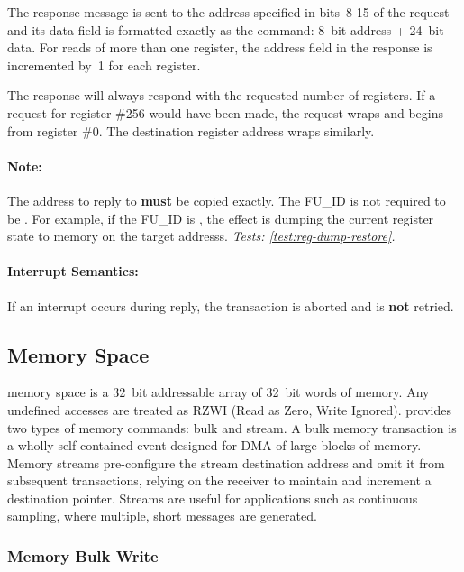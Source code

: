 The response message is sent to the \bus address specified in bits~8-15 of the
request and its data field is formatted exactly as the
 command: 8~bit address + 24~bit data. For reads
of more than one register, the address field in the response is incremented
by~1 for each register.

The response will always respond with the requested number of registers. If a
request for register \#256 would have been made, the request wraps and begins
from register \#0. The destination register address wraps similarly.

\paragraph{Note:} The \bus address to reply to {\bf must} be copied
exactly. The FU\_ID is not required to be . For
example, if the FU\_ID is , the effect is
dumping the current register state to memory on the target addresss.
{\em Tests: \ref{test:reg-dump-restore}.}

\paragraph{Interrupt Semantics:} If an interrupt occurs during reply, the
transaction is aborted and is {\bf not} retried.

\subsection{Memory Space}
\label{cmd:mem}
\proto memory space is a 32~bit addressable array of 32~bit words of memory.
Any undefined accesses are treated as RZWI (Read as Zero, Write Ignored).
\proto provides two types of memory commands: bulk and stream. A bulk memory
transaction is a wholly self-contained event designed for DMA of large blocks
of memory. Memory streams pre-configure the stream destination address and
omit it from subsequent transactions, relying on the receiver to maintain and
increment a destination pointer. Streams are useful for applications such as
continuous sampling, where multiple, short messages are generated.

\subsubsection{Memory Bulk Write}
\label{cmd:mem-bulk-write}

